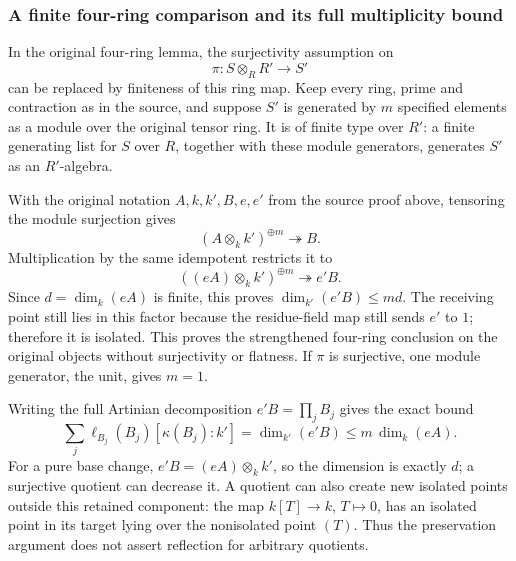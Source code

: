 \subsubsection{A finite four-ring comparison and its full multiplicity bound}\label{algebra-proof-031-a-finite-four-ring-comparison-and-its-full-multiplicity-bound}

In the original four-ring lemma, the surjectivity assumption on \[
 \pi:S\otimes_RR'\longrightarrow S'
\] can be replaced by finiteness of this ring map. Keep every ring, prime and contraction as in the source, and suppose \(S'\) is generated by \(m\) specified elements as a module over the original tensor ring. It is of finite type over \(R'\): a finite generating list for \(S\) over \(R\), together with these module generators, generates \(S'\) as an \(R'\)-algebra.

With the original notation \(A,k,k',B,e,e'\) from the source proof above, tensoring the module surjection gives \[
 (A\otimes_k k')^{\oplus m}\twoheadrightarrow B.
\] Multiplication by the same idempotent restricts it to \[
 ((eA)\otimes_k k')^{\oplus m}\twoheadrightarrow e'B.
\] Since \(d=\dim_k(eA)\) is finite, this proves \(\dim_{k'}(e'B)\le md\). The receiving point still lies in this factor because the residue-field map still sends \(e'\) to \(1\); therefore it is isolated. This proves the strengthened four-ring conclusion on the original objects without surjectivity or flatness. If \(\pi\) is surjective, one module generator, the unit, gives \(m=1\).

Writing the full Artinian decomposition \(e'B=\prod_j B_j\) gives the exact bound \[
 \sum_j\ell_{B_j}(B_j)[\kappa(B_j):k']
       =\dim_{k'}(e'B)\le m\,\dim_k(eA).
\] For a pure base change, \(e'B=(eA)\otimes_k k'\), so the dimension is exactly \(d\); a surjective quotient can decrease it. A quotient can also create new isolated points outside this retained component: the map \(k[T]\to k\), \(T\mapsto0\), has an isolated point in its target lying over the nonisolated point \((T)\). Thus the preservation argument does not assert reflection for arbitrary quotients.

